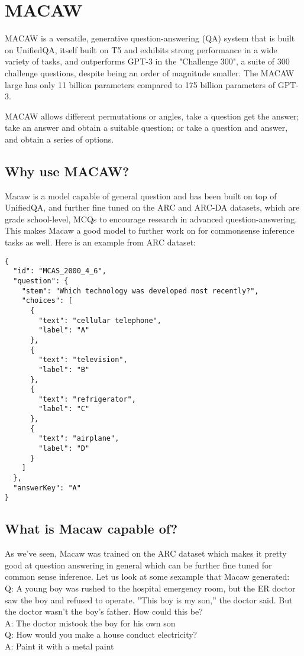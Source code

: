 \section{MACAW}
MACAW\cite{MacawIntro} is a versatile, generative question-answering (QA) system that is built on UnifiedQA, itself built on T5 and exhibits strong performance in a wide variety of tasks, and outperforms GPT-3 in the "Challenge 300", a suite of 300 challenge questions, despite being an order of magnitude smaller. The MACAW large has only 11 billion parameters compared to 175 billion parameters of GPT-3. 

MACAW allows different permutations or angles, take a question get the answer; take an answer and obtain a suitable question; or take a question and answer, and obtain a series of options.
\subsection{Why use MACAW?}
Macaw is a model capable of general question and has been built on top of UnifiedQA\cite{UnifiedQAIntro}, and further fine tuned on the ARC and ARC-DA datasets, which are grade school-level, MCQs to encourage research in advanced question-answering. This makes Macaw a good model to further work on for commonsense inference tasks as well. Here is an example from ARC dataset:
\begin{lstlisting}[breaklines]
{
  "id": "MCAS_2000_4_6",
  "question": {
    "stem": "Which technology was developed most recently?",
    "choices": [
      {
        "text": "cellular telephone",
        "label": "A"
      },
      {
        "text": "television",
        "label": "B"
      },
      {
        "text": "refrigerator",
        "label": "C"
      },
      {
        "text": "airplane",
        "label": "D"
      }
    ]
  },
  "answerKey": "A"
}
\end{lstlisting}
\subsection{What is Macaw capable of?}
As we've seen, Macaw was trained on the ARC dataset which makes it pretty good at question answering in general which can be further fine tuned for common sense inference. Let us look at some sexample that Macaw generated\cite{MacawIntro}:\\
Q: A young boy was rushed to the hospital emergency room, but
the ER doctor saw the boy and refused to operate. ”This boy is my
son,” the doctor said. But the doctor wasn’t the boy’s father. How
could this be?\\
A: The doctor mistook the boy for his own son\\
Q: How would you make a house conduct electricity?\\
A: Paint it with a metal paint\\

